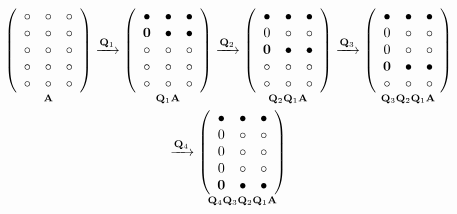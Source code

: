 \begin{gather*}
	  \underset{\mA}{\left({\begin{array}{*{20}c} \circ    & \circ    & \circ    \\ \circ    & \circ    & \circ    \\ \circ    & \circ    & \circ    \\ \circ    & \circ    & \circ    \\ \circ    & \circ    & \circ    \\ \end{array}} \right) }
	\xrightarrow{\mQ_1}
	\underset{\mQ_1 \mA}{ \left({\begin{array}{*{20}c} \bullet  & \bullet  & \bullet  \\ \mathbf{0}  & \bullet  & \bullet  \\ \circ    & \circ    & \circ    \\ \circ    & \circ    & \circ    \\ \circ    & \circ    & \circ    \\ \end{array}} \right) }
	\xrightarrow{\mQ_2}
	\underset{\mQ_2 \mQ_1 \mA}{ \left({\begin{array}{*{20}c} \bullet  & \bullet  & \bullet  \\ 0        & \circ    & \circ    \\ \mathbf{0}  & \bullet  & \bullet  \\ \circ    & \circ    & \circ    \\ \circ    & \circ    & \circ    \\ \end{array}} \right) }
	\xrightarrow{\mQ_3}
	\underset{\mQ_3 \mQ_2 \mQ_1 \mA}{ \left({\begin{array}{*{20}c} \bullet  & \bullet  & \bullet  \\ 0       & \circ    & \circ    \\ 0       & \circ    & \circ    \\ \mathbf{0}  & \bullet  & \bullet  \\ \circ    & \circ    & \circ    \\ \end{array}} \right) }
	\\
	\xrightarrow{\mQ_4}
	\underset{\mQ_4 \mQ_3 \mQ_2 \mQ_1 \mA}{ \left({\begin{array}{*{20}c} \bullet  & \bullet  & \bullet  \\ 0       & \circ    & \circ    \\ 0       & \circ    & \circ    \\ 0       & \circ    & \circ    \\ \mathbf{0}  & \bullet  & \bullet  \\ \end{array}} \right) }

\end{gather*}
